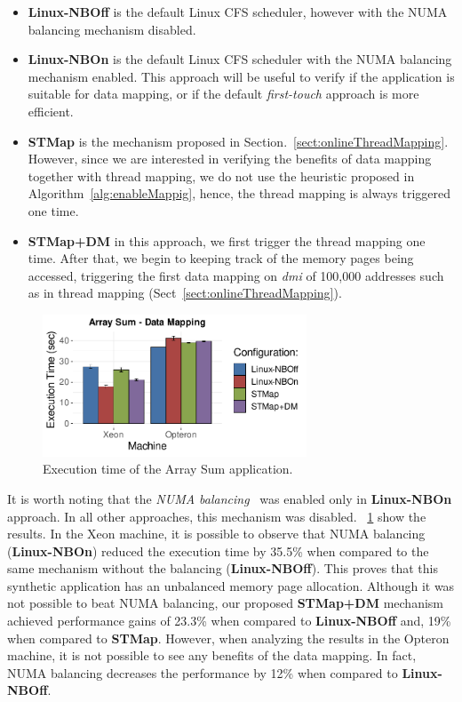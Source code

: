 \begin{itemize}
	\item \textbf{Linux-NBOff} is the default Linux CFS scheduler, however with the NUMA balancing mechanism disabled.
	
	\item \textbf{Linux-NBOn} is the default Linux CFS scheduler with the NUMA balancing mechanism enabled. This approach will be useful to verify if the application is suitable for data mapping, or if the default \emph{first-touch} approach is more efficient.
	
	\item \textbf{STMap} is the mechanism proposed in Section.~\ref{sect:onlineThreadMapping}. However, since we are interested in verifying the benefits of data mapping together with thread mapping, we do not use the heuristic proposed in Algorithm~\ref{alg:enableMappig}, hence, the thread mapping is always triggered one time. 
	
	\item \textbf{STMap+DM} in this approach, we first trigger the thread mapping one time. After that, we begin to keeping track of the memory pages being accessed, triggering the first data mapping on \emph{dmi} of 100,000 addresses such as in thread mapping (Sect~\ref{sect:onlineThreadMapping}). 
\end{itemize}

\begin{figure}[!ht]
	\centering
	\includegraphics[width=0.7\textwidth]{figures/sharingAwareDataMapping/ArraySumDataMapping.pdf}
	\caption{Execution time of the Array Sum application.}
	\label{fig:arraySumDataMapping}
\end{figure}

It is worth noting that the \emph{NUMA balancing}~\cite{NumaB:2020} was enabled only in \textbf{Linux-NBOn} approach. In all other approaches, this mechanism was disabled. \figurename~\ref{fig:arraySumDataMapping} show the results. In the Xeon machine, it is possible to observe that NUMA balancing (\textbf{Linux-NBOn}) reduced the execution time by 35.5\% when compared to the same mechanism without the balancing (\textbf{Linux-NBOff}). This proves that this synthetic application has an unbalanced memory page allocation. Although it was not possible to beat NUMA balancing, our proposed \textbf{STMap+DM} mechanism achieved performance gains of 23.3\% when compared to \textbf{Linux-NBOff} and, 19\% when compared to \textbf{STMap}. However, when analyzing the results in the Opteron machine, it is not possible to see any benefits of the data mapping. In fact, NUMA balancing decreases the performance by 12\% when compared to \textbf{Linux-NBOff}. %

